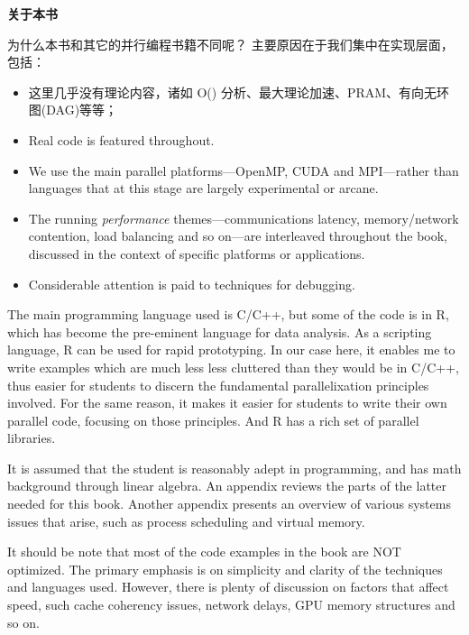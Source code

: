 ﻿\newpage

\begin{center}
{\bf \large 关于本书}
\end{center}

为什么本书和其它的并行编程书籍不同呢？
主要原因在于我们集中在实现层面，包括：

\begin{itemize}

\item 这里几乎没有理论内容，诸如 O() 分析、最大理论加速、PRAM、有向无环图(DAG)等等；

\item Real code is featured throughout.

\item We use the main parallel platforms---OpenMP, CUDA and MPI---rather
than languages that at this stage are largely experimental or arcane.

\item The running {\it performance} themes---communications latency,
memory/network contention, load balancing and so on---are interleaved
throughout the book, discussed in the context of specific platforms or
applications.

\item Considerable attention is paid to techniques for debugging.

\end{itemize}

The main programming language used is C/C++, but some of the code is in
R, which has become the pre-eminent language for data analysis.  As a
scripting language, R can be used for rapid prototyping.  In our case
here, it enables me to write examples which are much less less cluttered
than they would be in C/C++, thus easier for students to discern the
fundamental parallelixation principles involved.  For the same reason,
it makes it easier for students to write their own parallel code,
focusing on those principles.  And R has a rich set of parallel
libraries.

It is assumed that the student is reasonably adept in programming, and
has math background through linear algebra.  An appendix reviews the
parts of the latter needed for this book.  Another appendix presents an
overview of various systems issues that arise, such as process
scheduling and virtual memory.

It should be note that most of the code examples in the book are NOT
optimized.  The primary emphasis is on simplicity and clarity of the
techniques and languages used.  However, there is plenty of discussion
on factors that affect speed, such cache coherency issues, network
delays, GPU memory structures and so on.

